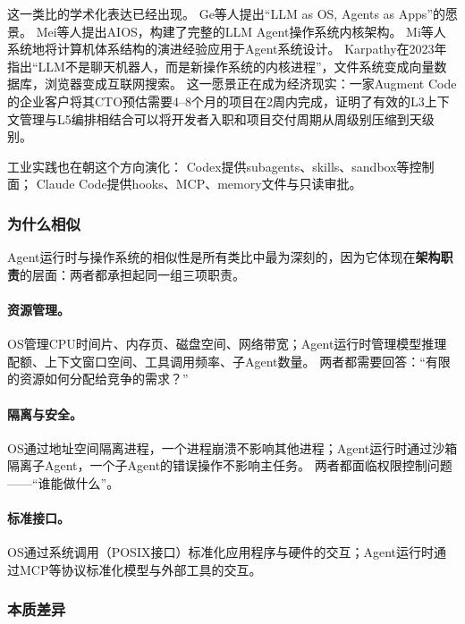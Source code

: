 这一类比的学术化表达已经出现。
Ge等人提出``LLM as OS, Agents as Apps''的愿景\cite{ge2023llmos}。
Mei等人提出AIOS，构建了完整的LLM Agent操作系统内核架构\cite{mei2024aios}。
Mi等人系统地将计算机体系结构的演进经验应用于Agent系统设计\cite{mi2025llmagentscomputersystems}。
Karpathy在2023年指出``LLM不是聊天机器人，而是新操作系统的内核进程''，文件系统变成向量数据库，浏览器变成互联网搜索\cite{karpathy2023lmos}。
这一愿景正在成为经济现实：一家Augment Code的企业客户将其CTO预估需要4--8个月的项目在2周内完成\cite{anthropic2026agenticreport}，证明了有效的L3上下文管理与L5编排相结合可以将开发者入职和项目交付周期从周级别压缩到天级别。

工业实践也在朝这个方向演化：
Codex提供subagents、skills、sandbox等控制面\cite{openai_codex_overview_2026}；
Claude Code提供hooks、MCP、memory文件与只读审批\cite{anthropic_claudecode_overview_2026}。

\subsubsection{为什么相似}

Agent运行时与操作系统的相似性是所有类比中最为深刻的，因为它体现在\textbf{架构职责}的层面：两者都承担起同一组三项职责。

\paragraph{资源管理。}
OS管理CPU时间片、内存页、磁盘空间、网络带宽；Agent运行时管理模型推理配额、上下文窗口空间、工具调用频率、子Agent数量。
两者都需要回答：``有限的资源如何分配给竞争的需求？''

\paragraph{隔离与安全。}
OS通过地址空间隔离进程，一个进程崩溃不影响其他进程\cite{ostep_2023}；Agent运行时通过沙箱隔离子Agent，一个子Agent的错误操作不影响主任务\cite{openai_codex_sandbox_2026,anthropic_claudecode_sandbox_2026}。
两者都面临权限控制问题——``谁能做什么''。

\paragraph{标准接口。}
OS通过系统调用（POSIX接口）标准化应用程序与硬件的交互；Agent运行时通过MCP等协议标准化模型与外部工具的交互\cite{mcp_intro_2026}。

\subsubsection{本质差异}

